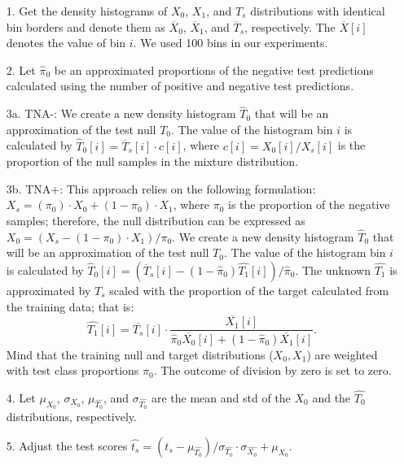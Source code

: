 \documentclass{article}
\begin{document}
\begin{enumerate}%
	\itemsep-3pt  		
	\item [1.] Get the density histograms of $X_0$, $X_1$, and $T_s$ distributions with identical bin borders and denote them as $\overline{X}_0$, $\overline{X}_1$, and $\overline{T}_s$, respectively. The $\overline{X}[i]$ denotes the value of bin $i$.  We used 100 bins in our experiments.
	
	\item [2.] Let $\hat{\pi}_0$ be an approximated proportions of the negative test predictions calculated using the number of positive and negative test predictions. 
	
	\item [3a.] TNA-:  We create a new density histogram $\hat{T}_0$ that will be an approximation of the test null $T_0$. The value of the histogram bin $i$ is calculated  by $\hat{T}_0[i] = \overline{T}_s[i]\cdot c[i]$, where $c[i]=X_0[i]/X_s[i]$ is the proportion of the null samples in the mixture distribution.
	\item [3b.] TNA+: This approach relies on the following formulation: $X_s = (\pi_0) \cdot X_0 + (1-\pi_0) \cdot X_1$, where $\pi_0$ is the proportion of the negative samples; therefore, the null distribution can be expressed as $X_0 = (X_s - (1-\pi_0) \cdot X_1)/\pi_0$. We create a new density histogram $\hat{T}_0$ that will be an approximation of the test null $T_0$. The value of the histogram bin $i$ is calculated  by $\hat{T}_0[i] = (\overline{T}_s[i] -  (1-\hat{\pi}_0)\hat{T_1}[i])/\hat{\pi}_0$. The unknown $\hat{T_1}$ is approximated by $T_s$ scaled with the proportion of the target calculated from the training data; that is:  $$\hat{T_1}[i] = \overline{T_s}[i]\cdot \frac {\overline{X_1}[i]}{\hat{\pi}_0 \overline{X_0}[i] + (1-\hat{\pi}_0) \overline{X_1}[i]}.$$ Mind that the training null and target distributions ($X_0, X_1$) are weighted with test class proportions  $\hat{\pi}_0$. The outcome of division by zero is set to zero.
		
	\item [4.] Let $\mu_{X_0}$, $\sigma_{X_0}$, $\mu_{\hat{T_0}}$, and $\sigma_{\hat{T_0}}$ are the mean and std of the $X_0$ and the $\hat{T_0}$ distributions, respectively. 
	
	\item [5.] Adjust the test scores $\hat{t_s} = (t_s-\mu_{\hat{T_0}})/\sigma_{\hat{T_0}} \cdot \sigma_{\hat{X_0}} + \mu_{X_0}$.
\end{enumerate}
\end{document}
